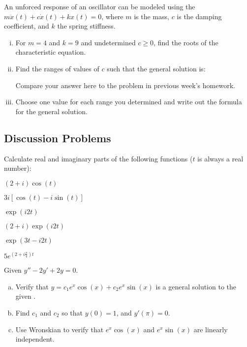 \begin{question}
An unforced response of an oscillator can be modeled using the \ode{} \(m \ddot x(t) + c \dot x(t) + k x(t) = 0\), where \(m\) is the mass, \(c\) is the damping coefficient, and \(k\) the spring stiffness.  
  \begin{enumerate}[(i)]
    \item  For \(m=4\) and \(k = 9\) and undetermined \(c \geq 0\), find the roots of the characteristic equation. \solspace{1in}
    \item Find the ranges of values of \(c\) such that the general solution is:
       Compare your answer here to the \sage problem in previous week's homework.

      \solspace{1in}
    \item Choose one value for each range you determined and write out the formula for the general solution. \solspace{2in}
    \end{enumerate}
    \solspace{4in}
\end{question}

\subsection*{Discussion Problems}

\begin{question}
  Calculate real and imaginary parts of the following functions (\(t\) is always a real number):
  \begin{colenumerate}[3]
  \item \((2+i)\cos(t)\)
  \item \(3i[ \cos(t) - i\sin (t) ]\)
  \item \(\exp( i2t )\)
  \item \((2+i)\exp( i2t )\)
  \item \(\exp(3t-i2t )\)
  \item \(5e^{(2+i \frac{\pi}{4})t}\)
  \end{colenumerate}
\end{question}

\begin{question}
Given $y''-2y'+2y = 0$.
\begin{enumerate}[(a)]
\item Verify that $y=c_1e^x\cos(x) + c_2 e^x\sin(x)$ is a general solution to the given \ode{}.
\item Find $c_1$ and $c_2$ so that $y(0) = 1$, and $y'(\pi) = 0$.
\item Use Wronskian to verify that $e^{x}\cos(x)$ and $e^{x}\sin(x) $ are linearly independent.
\end{enumerate}
\end{question}

